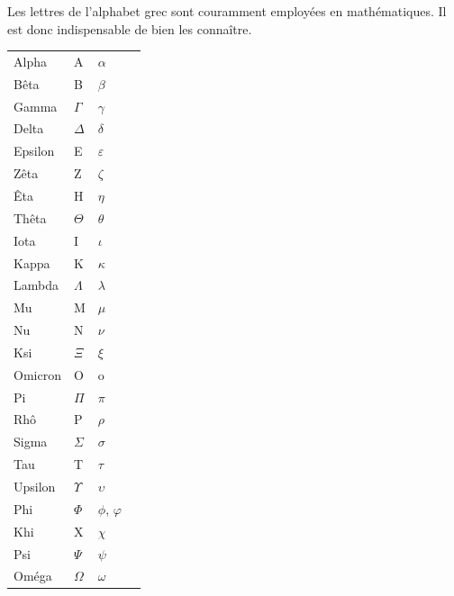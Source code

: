 \documentclass[11pt,a4paper]{book}
\theoremstyle{definition}
\theoremstyle{plain}
\begin{document}
\noindent Les lettres de l'alphabet grec sont couramment employées en mathématiques. Il est donc indispensable de bien les connaître.

\begin{center}

\def\arraystretch{1.2}
\setlength\tabcolsep{20pt}
\begin{tabular}{llll}
Alpha		& A 			& $\alpha$\\
Bêta			& B 			& $\beta$\\
Gamma		& $\Gamma$ 	& $\gamma$\\
Delta		& $\Delta$ 	& $\delta$\\
Epsilon		& E 			& $\varepsilon$\\
Zêta			& Z 			& $\zeta$\\
Êta			& H 			& $\eta$\\
Thêta		& $\Theta$ 	& $\theta$\\
Iota			& I 			& $\iota$\\
Kappa		& K 			& $\kappa$\\
Lambda		& $\Lambda$ 	& $\lambda$\\
Mu			& M 			& $\mu$\\
Nu			& N 			& $\nu$\\
Ksi			& $\Xi$ 		& $\xi$\\
Omicron		& O 			& o\\
Pi			& $\Pi$ 		& $\pi$\\
Rhô			& P 			& $\rho$\\
Sigma		& $\Sigma$ 	& $\sigma$\\
Tau			& T 			& $\tau$\\
Upsilon		& $\Upsilon$& $\upsilon$\\
Phi			& $\Phi$ 	& $\phi$, $\varphi$\\
Khi			& X 			& $\chi$\\
Psi			& $\Psi$ 	& $\psi$ \\
Oméga		& $\Omega$ 	& $\omega$\\
\end{tabular}
\end{center}














\printindex
\end{document}
